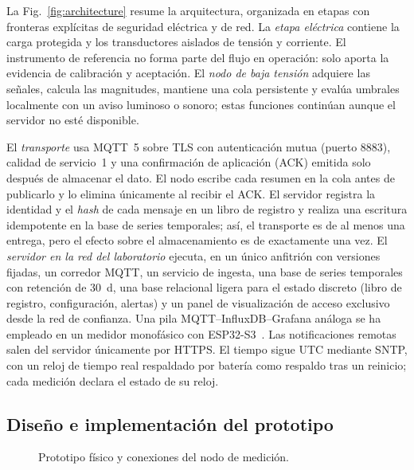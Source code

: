 La Fig.~\ref{fig:architecture} resume la arquitectura, organizada en etapas con fronteras explícitas de seguridad eléctrica y de red.
La \emph{etapa eléctrica} contiene la carga protegida y los transductores aislados de tensión y corriente.
El instrumento de referencia no forma parte del flujo en operación: solo aporta la evidencia de calibración y aceptación.
El \emph{nodo de baja tensión} adquiere las señales, calcula las magnitudes, mantiene una cola persistente y evalúa umbrales localmente con un aviso luminoso o sonoro; estas funciones continúan aunque el servidor no esté disponible.

El \emph{transporte} usa MQTT~5 sobre TLS con autenticación mutua (puerto 8883), calidad de servicio~1 y una confirmación de aplicación (ACK) emitida solo después de almacenar el dato.
El nodo escribe cada resumen en la cola antes de publicarlo y lo elimina únicamente al recibir el ACK.
El servidor registra la identidad y el \textit{hash} de cada mensaje en un libro de registro y realiza una escritura idempotente en la base de series temporales; así, el transporte es de al menos una entrega, pero el efecto sobre el almacenamiento es de exactamente una vez.
El \emph{servidor en la red del laboratorio} ejecuta, en un único anfitrión con versiones fijadas, un corredor MQTT, un servicio de ingesta, una base de series temporales con retención de \SI{30}{d}, una base relacional ligera para el estado discreto (libro de registro, configuración, alertas) y un panel de visualización de acceso exclusivo desde la red de confianza.
Una pila MQTT--InfluxDB--Grafana análoga se ha empleado en un medidor monofásico con ESP32-S3~\cite{desousa2026smartmeter}.
Las notificaciones remotas salen del servidor únicamente por HTTPS.
El tiempo sigue UTC mediante SNTP, con un reloj de tiempo real respaldado por batería como respaldo tras un reinicio; cada medición declara el estado de su reloj.

\subsection{Diseño e implementación del prototipo}
\label{sec:prototype}
\begin{figure}[t]
  \centering
  \caption{Prototipo físico y conexiones del nodo de medición.}
  \label{fig:prototype}
\end{figure}

